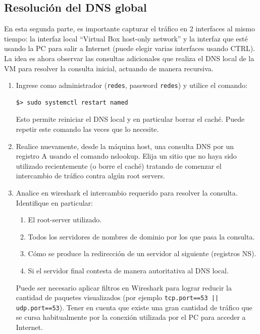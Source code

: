 \documentclass[a4paper,10pt]{article}
\begin{document}
\subsection*{Resolución del DNS global}

En esta segunda parte, es importante capturar el tráfico en 2 interfaces al mismo tiempo: la interfaz local ``Virtual Box host-only network'' y la interfaz que esté usando la PC para salir a Internet (puede elegir varias interfaces usando CTRL). La idea es ahora observar las consultas adicionales que realiza el DNS local de la VM para resolver la consulta inicial, actuando de manera recursiva.

\begin{enumerate}
    \item Ingrese como administrador (\texttt{redes}, password \texttt{redes}) y utilice el comando:
    \begin{verbatim}
$> sudo systemctl restart named
    \end{verbatim}
    Esto permite reiniciar el DNS local y en particular borrar el caché. Puede repetir este comando las veces que lo necesite.

    \item Realice nuevamente, desde la máquina host, una consulta DNS por un registro A usando el comando nslookup. Elija un sitio que no haya sido utilizado recientemente (o borre el caché) tratando de comenzar el intercambio de tráfico contra algún root servers.
    
    \item Analice en wireshark el intercambio requerido para resolver la consulta. Identifique en particular:
    \begin{enumerate}
        \item El root-server utilizado.
        \item Todos los servidores de nombres de dominio por los que pasa la consulta.
        \item Cómo se produce la redirección de un servidor al siguiente (registros NS).
        \item Si el servidor final contesta de manera autoritativa al DNS local.
    \end{enumerate}
    
    Puede ser necesario aplicar filtros en Wireshark para lograr reducir la cantidad de paquetes visualizados (por ejemplo \texttt{tcp.port==53 || udp.port==53}). Tener en cuenta que existe una gran cantidad de tráfico que se cursa habitualmente por la conexión utilizada por el PC para acceder a Internet.


\end{enumerate}
\end{document}
